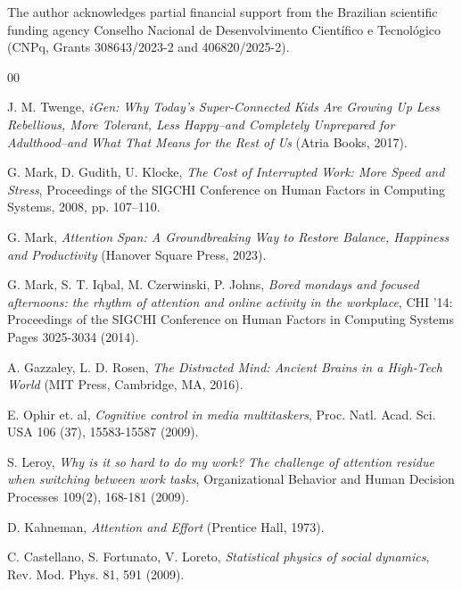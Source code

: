 \documentclass[preprint,12pt]{elsarticle}
\begin{document}
The author acknowledges partial financial support from the Brazilian scientific funding agency Conselho Nacional de Desenvolvimento Cient\'ifico e Tecnol\'ogico  (CNPq, Grants 308643/2023-2 and 406820/2025-2).












\begin{thebibliography}{00}



J. M. Twenge, \textit{iGen: Why Today's Super-Connected Kids Are Growing Up Less Rebellious, More Tolerant, Less Happy--and Completely Unprepared for Adulthood--and What That Means for the Rest of Us} (Atria Books, 2017).


G. Mark, D. Gudith, U. Klocke, \textit{The Cost of Interrupted Work: More Speed and Stress}, Proceedings of the SIGCHI Conference on Human Factors in Computing Systems, 2008, pp. 107–110.
  

G. Mark, \textit{Attention Span: A Groundbreaking Way to Restore Balance, Happiness and Productivity} (Hanover Square Press, 2023).


G. Mark, S. T. Iqbal, M. Czerwinski, P. Johns, \textit{Bored mondays and focused afternoons: the rhythm of attention and online activity in the workplace}, CHI '14: Proceedings of the SIGCHI Conference on Human Factors in Computing Systems
Pages 3025-3034 (2014).

  

A. Gazzaley, L. D. Rosen, \textit{The Distracted Mind: Ancient Brains in a High-Tech World} (MIT Press, Cambridge, MA, 2016).



E. Ophir et. al, \textit{Cognitive control in media multitaskers}, Proc. Natl. Acad. Sci. USA 106 (37), 15583-15587 (2009).


S. Leroy, \textit{Why is it so hard to do my work? The challenge of attention residue when switching between work tasks}, Organizational Behavior and Human Decision Processes 109(2), 168-181 (2009).


D. Kahneman, \textit{Attention and Effort} (Prentice Hall, 1973).



C. Castellano, S. Fortunato, V. Loreto, \textit{Statistical physics of social dynamics}, Rev. Mod. Phys. 81, 591 (2009).  



\end{thebibliography}
\end{document}
